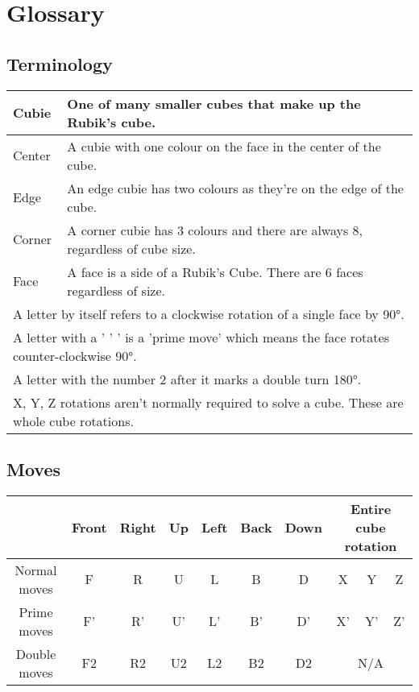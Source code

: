 \newpage
\section*{Glossary}
\subsection*{Terminology}
\begin{table}[!ht]
\centering
\begin{tabular}{|l|l|}
\hline
Cubie                & One of many smaller cubes that make up the Rubik's cube.                                   \\ \hline
Center               & A cubie with one colour on the face in the center of the cube.                             \\ \hline
Edge                 & An edge cubie has two colours as they're on the edge of the cube.                          \\ \hline
Corner               & A corner cubie has 3 colours and there are always 8, regardless of cube size.              \\ \hline
Face                 & A face is a side of a Rubik's Cube. There are 6 faces regardless of size.                  \\ \hline
\multicolumn{2}{|l|}{A letter by itself refers to a clockwise rotation of a single face by 90°.}                  \\ \hline
\multicolumn{2}{|l|}{A letter with a ' ' ' is a 'prime move' which means the face rotates counter-clockwise 90°.} \\ \hline
\multicolumn{2}{|l|}{A letter with the number 2 after it marks a double turn 180°.}                               \\ \hline
\multicolumn{2}{|l|}{X, Y, Z rotations aren't normally required to solve a cube. These are whole cube rotations.} \\ \hline
\end{tabular}
\end{table}

\subsection*{Moves}
\begin{table}[!ht]
\centering
\begin{tabular}{|c|c|c|c|c|c|c|c|c|c|}
\hline
             & Front & Right & Up & Left & Back & Down & \multicolumn{3}{c|}{Entire cube rotation} \\ \hline
Normal moves & F     & R     & U  & L    & B    & D    & X            & Y            & Z           \\ \hline
Prime moves  & F'    & R'    & U' & L'   & B'   & D'   & X'           & Y'           & Z'          \\ \hline
Double moves & F2    & R2    & U2 & L2   & B2   & D2   & \multicolumn{3}{c|}{N/A}                     \\ \hline
\end{tabular}
\end{table}
